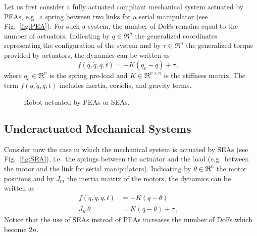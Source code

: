 Let us first consider a fully actuated compliant mechanical system actuated by PEAs, e.g.~a spring between two links for a serial manipulator (see Fig.~\ref{fig:PEA}). For such a system, the number of DoFs remains equal to the number of actuators. Indicating by $q\in\Re^n$
the generalized coordinates representing the configuration of the system and by $\tau\in\Re^n$ the generalized torque provided by actuators, the dynamics can be written as
\begin{equation}
\label{eq:FullyActuated}
f(\ddot q,\dot q, q, t)=-K(q_e-q)+\tau\,,
\end{equation}
where $q_e\in\Re^n$ is the spring pre-load and $K\in\Re^{n\times n}$ is the stiffness matrix. The term $f(\ddot q,\dot q, q, t)$ includes inertia, coriolis, and gravity terms.
\begin{figure}[!t]
\centering
{}
\quad
{}
\caption{Robot actuated by PEAs or SEAs.}
\label{fig:PEA_SEA}
\end{figure}

\subsection{Underactuated Mechanical Systems}
\label{sec:UnderActuatedSystems}

Consider now the case in which the mechanical system is actuated by SEAs (see Fig.~\ref{fig:SEA}), i.e.~the springs between the actuator and the load (e.g.~between the motor and the link for serial manipulators). Indicating by $\theta\in\Re^n$ the motor positions and by $J_m$ the inertia matrix of the motors, the dynamics can be written as
\begin{align}
\label{eq:actuated1_SEA}
f(\ddot{q}, \dot{q}, q, t) &= - K(q - \theta) \\
J_{m} \ddot{\theta} &= K(q - \theta) + \tau\,,
\label{eq:actuated2_SEA}
\end{align}
Notice that the use of SEAs instead of PEAs increases the number of DoFs which become $2n$. 


